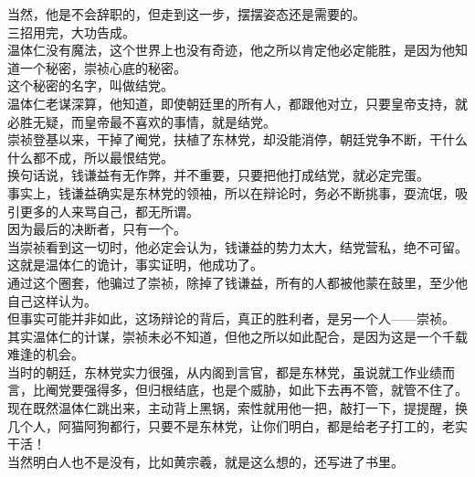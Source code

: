 \begin{multicols}{\theparacolNo}
当然，他是不会辞职的，但走到这一步，摆摆姿态还是需要的。\\

三招用完，大功告成。\\

温体仁没有魔法，这个世界上也没有奇迹，他之所以肯定他必定能胜，是因为他知道一个秘密，崇祯心底的秘密。\\

这个秘密的名字，叫做结党。\\

温体仁老谋深算，他知道，即使朝廷里的所有人，都跟他对立，只要皇帝支持，就必胜无疑，而皇帝最不喜欢的事情，就是结党。\\

崇祯登基以来，干掉了阉党，扶植了东林党，却没能消停，朝廷党争不断，干什么什么都不成，所以最恨结党。\\

换句话说，钱谦益有无作弊，并不重要，只要把他打成结党，就必定完蛋。\\

事实上，钱谦益确实是东林党的领袖，所以在辩论时，务必不断挑事，耍流氓，吸引更多的人来骂自己，都无所谓。\\

因为最后的决断者，只有一个。\\

当崇祯看到这一切时，他必定会认为，钱谦益的势力太大，结党营私，绝不可留。\\

这就是温体仁的诡计，事实证明，他成功了。\\

通过这个圈套，他骗过了崇祯，除掉了钱谦益，所有的人都被他蒙在鼓里，至少他自己这样认为。\\

但事实可能并非如此，这场辩论的背后，真正的胜利者，是另一个人——崇祯。\\

其实温体仁的计谋，崇祯未必不知道，但他之所以如此配合，是因为这是一个千载难逢的机会。\\

当时的朝廷，东林党实力很强，从内阁到言官，都是东林党，虽说就工作业绩而言，比阉党要强得多，但归根结底，也是个威胁，如此下去再不管，就管不住了。\\

现在既然温体仁跳出来，主动背上黑锅，索性就用他一把，敲打一下，提提醒，换几个人，阿猫阿狗都行，只要不是东林党，让你们明白，都是给老子打工的，老实干活！\\

当然明白人也不是没有，比如黄宗羲，就是这么想的，还写进了书里。\\


\end{multicols}
